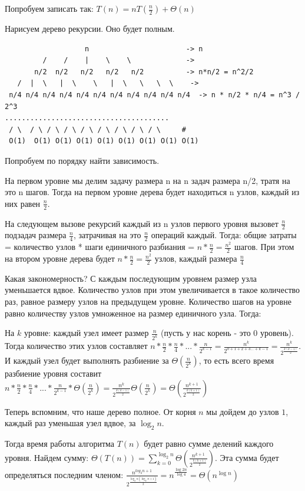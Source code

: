 \documentclass{article}
\begin{document}
Попробуем записать так: $T(n) = n T(\frac{n}{2}) + \Theta(n)$

Нарисуем дерево рекурсии. Оно будет полным.
\begin{verbatim}
                   n                       -> n
         /    /    |    \    \             -> 
       n/2  n/2   n/2   n/2   n/2          -> n*n/2 = n^2/2
   /  |  \   |  \    \   |  \   \   \  \    -> 
 n/4 n/4 n/4 n/4 n/4 n/4 n/4 n/4 n/4 n/4 n/4  -> n * n/2 * n/4 = n^3 / 2^3
.......................................
 / \  / \ / \ / \ / \ / \ / \ / \ / \     # 
 O(1)  O(1) O(1) O(1) O(1) O(1) O(1) O(1) O(1) 

\end{verbatim}

Попробуем по порядку найти зависимость.

На первом уровне мы делим задачу размера n на n задач размера n/2, тратя на это n шагов. Тогда на первом уровне дерева будет находиться n узлов, каждый из них равен $\frac{n}{2}$. 

На следующем вызове рекурсий каждый из n узлов первого уровня вызовет $\frac{n}{2}$ подзадач размера $\frac{n}{4}$, затрачивая на это $\frac{n}{2}$ операций каждый. Тогда: общие затраты = количество узлов * шаги единичного разбиания = $n * \frac{n}{2} = \frac{n^2}{2}$ шагов. При этом на втором уровне дерева будет $n * \frac{n}{2} = \frac{n^2}{2}$ узлов, каждый размера $\frac{n}{4}$

Какая закономерность? С каждым последующим уровнем размер узла уменьшается вдвое. Количество узлов при этом увеличивается в такое количество раз, равное размеру узлов на предыдущем уровне. Количество шагов на уровне равно количеству узлов умноженное на размер единичного узла. Тогда:

На $k$ уровне: каждый узел имеет размер $\frac{n}{2^k}$ (пусть у нас корень - это 0 уровень). Тогда количество этих узлов составляет $n * \frac{n}{2} * \frac{n}{4} * ... * \frac{n}{2^{k-1}} = \frac{n^k}{2^{0+1+2+3...+k-1}} = \frac{n^k}{2^{\frac{k(k-1)}{2}}}$. И каждый узел будет выполнять разбиение за $\Theta(\frac{n}{2^k})$, то есть всего время разбиение уровня составит $n * \frac{n}{2} * \frac{n}{4} * ... * \frac{n}{2^{k-1}} * \Theta(\frac{n}{2^k}) = \frac{n^k}{2^{\frac{k(k-1)}{2}}} \Theta(\frac{n}{2^k}) = \Theta(\frac{n^{k+1}}{2^{\frac{k(k+1)}{2}}})$

Теперь вспомним, что наше дерево полное. От корня $n$ мы дойдем до узлов $1$, каждый раз уменьшая узел вдвое, за $\log_2 n$. 

Тогда время работы алгоритма $T(n)$ будет равно сумме делений каждого уровня. Найдем сумму: $\Theta(T(n)) = \sum_{k=0}^{\log_2 n} \Theta(\frac{n^{k+1}}{2^{\frac{k(k+1)}{2}}})$. Эта сумма будет определяться последним членом: $\frac{n^{log_2 n + 1}}{2^{\frac{\log_2n (\log_2n + 1)}{2}}} = n^{\frac{\log 2n}{\log 4}} = \Theta(n^{\log n})$
\end{document}
